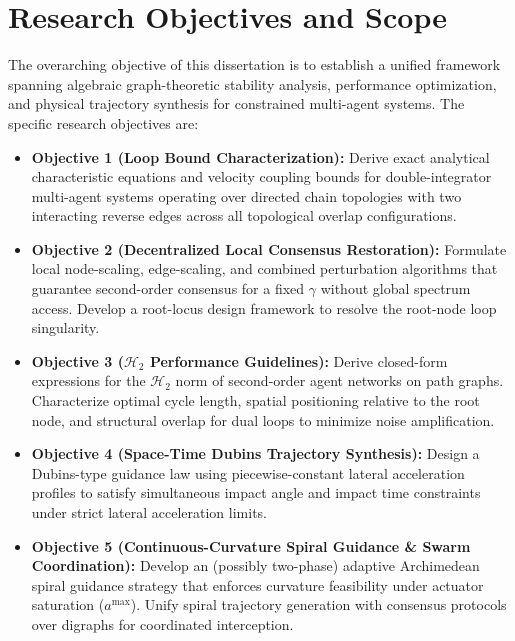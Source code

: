 \section{Research Objectives and Scope}
The overarching objective of this dissertation is to establish a unified framework spanning algebraic graph-theoretic stability analysis, performance optimization, and physical trajectory synthesis for constrained multi-agent systems. The specific research objectives are:
\begin{itemize}
    \item \textbf{Objective 1 (Loop Bound Characterization):} Derive exact analytical characteristic equations and velocity coupling bounds for double-integrator multi-agent systems operating over directed chain topologies with two interacting reverse edges across all topological overlap configurations.
    \item \textbf{Objective 2 (Decentralized Local Consensus Restoration):} Formulate local node-scaling, edge-scaling, and combined perturbation algorithms that guarantee second-order consensus for a fixed $\gamma$ without global spectrum access. Develop a root-locus design framework to resolve the root-node loop singularity.
    \item \textbf{Objective 3 ($\mathcal{H}_2$ Performance Guidelines):} Derive closed-form expressions for the $\mathcal{H}_2$ norm of second-order agent networks on path graphs. Characterize optimal cycle length, spatial positioning relative to the root node, and structural overlap for dual loops to minimize noise amplification. 
    \item \textbf{Objective 4 (Space-Time Dubins Trajectory Synthesis):} Design a Dubins-type guidance law using piecewise-constant lateral acceleration profiles to satisfy simultaneous impact angle and impact time constraints under strict lateral acceleration limits.
    \item \textbf{Objective 5 (Continuous-Curvature Spiral Guidance \& Swarm Coordination):} Develop an (possibly two-phase) adaptive Archimedean spiral guidance strategy that enforces curvature feasibility under actuator saturation ($a^{\text{max}}$). Unify spiral trajectory generation with consensus protocols over digraphs for coordinated interception.
\end{itemize}

